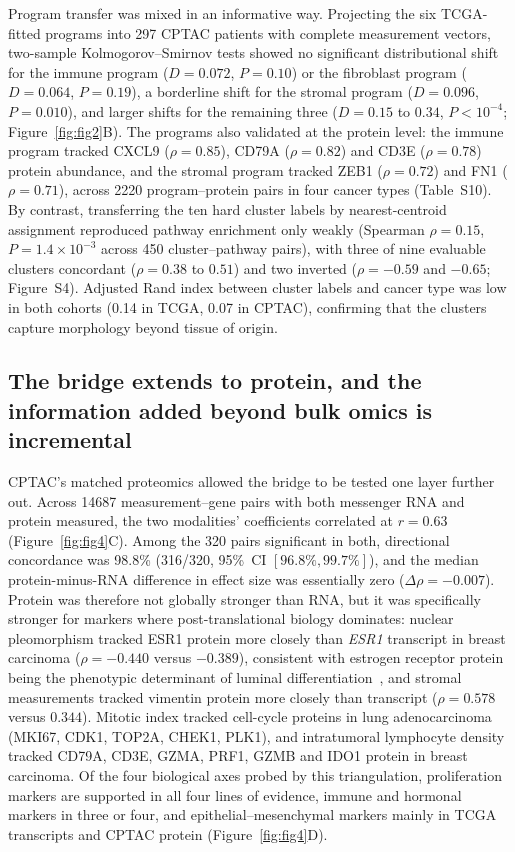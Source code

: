 Program transfer was mixed in an informative way. Projecting the six
TCGA-fitted programs into 297 CPTAC patients with complete measurement vectors,
two-sample Kolmogorov--Smirnov tests showed no significant distributional shift
for the immune program ($D = 0.072$, $P = 0.10$) or the fibroblast program
($D = 0.064$, $P = 0.19$), a borderline shift for the stromal program
($D = 0.096$, $P = 0.010$), and larger shifts for the remaining three
($D = 0.15$ to $0.34$, $P < 10^{-4}$; Figure~\ref{fig:fig2}B). The programs also
validated at the protein level: the immune program tracked CXCL9
($\rho = 0.85$), CD79A ($\rho = 0.82$) and CD3E ($\rho = 0.78$) protein
abundance, and the stromal program tracked ZEB1 ($\rho = 0.72$) and FN1
($\rho = 0.71$), across \num{2220} program--protein pairs in four cancer types
(Table~S10). By contrast, transferring the ten hard cluster labels by
nearest-centroid assignment reproduced pathway enrichment only weakly (Spearman
$\rho = 0.15$, $P = 1.4 \times 10^{-3}$ across 450 cluster--pathway pairs), with
three of nine evaluable clusters concordant ($\rho = 0.38$ to $0.51$) and two
inverted ($\rho = -0.59$ and $-0.65$; Figure~S4). Adjusted Rand index between
cluster labels and cancer type was low in both cohorts (0.14 in TCGA, 0.07 in
CPTAC), confirming that the clusters capture morphology beyond tissue of origin.

\subsection{The bridge extends to protein, and the information added beyond bulk omics is incremental}
\label{sec:results:protein}

CPTAC's matched proteomics allowed the bridge to be tested one layer further
out. Across \num{14687} measurement--gene pairs with both messenger RNA and protein
measured, the two modalities' coefficients correlated at $r = 0.63$
(Figure~\ref{fig:fig4}C). Among the 320 pairs significant in both, directional
concordance was 98.8\% (316/320, 95\%~CI $[96.8\%, 99.7\%]$), and the median
protein-minus-RNA difference in effect size was essentially zero
($\Delta\rho = -0.007$). Protein was therefore not globally stronger than RNA,
but it was specifically stronger for markers where post-translational biology
dominates: nuclear pleomorphism tracked ESR1 protein more closely than
\textit{ESR1} transcript in breast carcinoma ($\rho = -0.440$ versus $-0.389$),
consistent with estrogen receptor protein being the phenotypic determinant of
luminal differentiation~\cite{allison2020erpr}, and stromal
measurements tracked vimentin protein more closely than transcript
($\rho = 0.578$ versus $0.344$). Mitotic index tracked cell-cycle proteins in
lung adenocarcinoma (MKI67, CDK1, TOP2A, CHEK1, PLK1), and intratumoral lymphocyte
density tracked CD79A, CD3E, GZMA, PRF1, GZMB and IDO1 protein in breast
carcinoma. Of the four biological axes probed by this triangulation, proliferation markers
are supported in all four lines of evidence, immune and hormonal markers in three
or four, and epithelial--mesenchymal markers mainly in TCGA transcripts and CPTAC
protein (Figure~\ref{fig:fig4}D).


